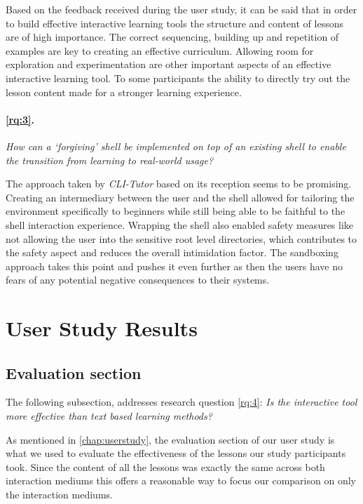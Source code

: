 Based on the feedback received during the user study, it can be said that in
order to build effective interactive learning tools the structure and content
of lessons are of high importance. The correct sequencing, building up and
repetition of examples are key to creating an effective curriculum. Allowing
room for exploration and experimentation are other important aspects of an
effective interactive learning tool. To some participants the ability to
directly try out the lesson content made for a stronger learning experience.


\paragraph{\ref{rq:3}.} \textit{How can a `forgiving' shell be implemented on top of an existing
	shell to enable the transition from learning to real-world usage?}

The approach taken by \textit{CLI-Tutor} based on its reception seems to be
promising. Creating an intermediary between the user and the shell allowed for
tailoring the environment specifically to beginners while still being able to
be faithful to the shell interaction experience. Wrapping the shell also enabled
safety measures like not allowing the user into the sensitive root level
directories, which contributes to the safety aspect and reduces the overall
intimidation factor. The sandboxing approach takes this point and pushes it
even further as then the users have no fears of any potential negative
consequences to their systems.



\section{User Study Results}

\subsection{Evaluation section}

The following subsection, addresses research question \ref{rq:4}: \textit{Is
	the interactive tool more effective than text based learning
	methods?}

As mentioned in \autoref{chap:userstudy}, the evaluation section of our user
study is what we used to evaluate the effectiveness of the lessons our study
participants took. Since the content of all the lessons was exactly the same
across both interaction mediums this offers a reasonable way to focus
our comparison on only the interaction mediums.

